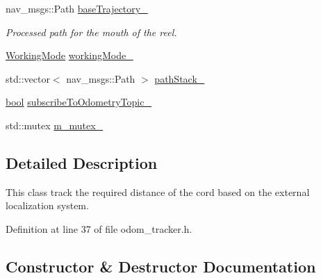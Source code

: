 \begin{DoxyCompactItemize}
nav\+\_\+msgs\+::\+Path \hyperlink{classmove__base__z__client_1_1odom__tracker_1_1OdomTracker_a83fa5a9bfe0b2683eee33444d3f030ea}{base\+Trajectory\+\_\+}
\begin{DoxyCompactList}\small\item\em Processed path for the mouth of the reel. \end{DoxyCompactList}\item 
\hyperlink{namespacemove__base__z__client_1_1odom__tracker_adf3e5fc3644563922cc64a20a0197224}{Working\+Mode} \hyperlink{classmove__base__z__client_1_1odom__tracker_1_1OdomTracker_a39c97d7bf6003fde62e0bed1a221e3f0}{working\+Mode\+\_\+}
\item 
std\+::vector$<$ nav\+\_\+msgs\+::\+Path $>$ \hyperlink{classmove__base__z__client_1_1odom__tracker_1_1OdomTracker_abb14ccfc0c5273714a5279baa07dfd11}{path\+Stack\+\_\+}
\item 
\hyperlink{classbool}{bool} \hyperlink{classmove__base__z__client_1_1odom__tracker_1_1OdomTracker_af07071223326ba38fc95037717102bb4}{subscribe\+To\+Odometry\+Topic\+\_\+}
\item 
std\+::mutex \hyperlink{classmove__base__z__client_1_1odom__tracker_1_1OdomTracker_a63676e03be48b18ac48d5e2f11f19a25}{m\+\_\+mutex\+\_\+}
\end{DoxyCompactItemize}


\subsection{Detailed Description}
This class track the required distance of the cord based on the external localization system. 

Definition at line 37 of file odom\+\_\+tracker.\+h.



\subsection{Constructor \& Destructor Documentation}
\mbox{\label{classmove__base__z__client_1_1odom__tracker_1_1OdomTracker_ab6d1b57e311a9434a95c112e2f62501f}} 
